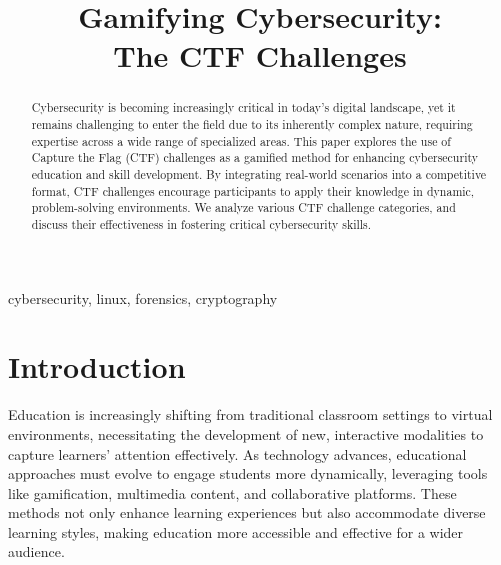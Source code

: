 \documentclass[conference]{IEEEtran}
\begin{document}
\title{Gamifying Cybersecurity:\\The CTF Challenges}

\author{
\and
{}
}

\maketitle

\begin{abstract}
Cybersecurity is becoming increasingly critical in today's digital landscape,
  yet it remains challenging to enter the field due to its inherently complex
  nature, requiring expertise across a wide range of specialized areas. This
  paper explores the use of Capture the Flag (CTF) challenges as a gamified
  method for enhancing cybersecurity education and skill development. By
  integrating real-world scenarios into a competitive format, CTF challenges
  encourage participants to apply their knowledge in dynamic, problem-solving
  environments. We analyze various CTF challenge categories, and discuss their
  effectiveness in fostering critical cybersecurity skills.
\end{abstract}

\begin{IEEEkeywords}
cybersecurity, linux, forensics, cryptography
\end{IEEEkeywords}

\section{Introduction}

Education is increasingly shifting from traditional classroom settings to
virtual environments, necessitating the development of new, interactive
modalities to capture learners' attention effectively. As technology advances,
educational approaches must evolve to engage students more dynamically,
leveraging tools like gamification, multimedia content, and collaborative
platforms.
These methods not only enhance learning experiences but also
accommodate diverse learning styles, making education more accessible and
effective for a wider audience.
\end{document}
